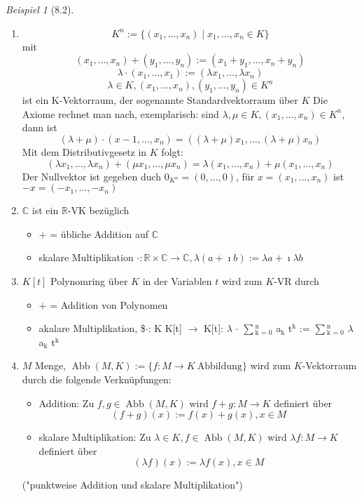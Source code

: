 \documentclass[a4paper]{scrartcl}
\DeclareMathOperator{\Abb}{Abb}
\theoremstyle{definition}
\theoremstyle{plain}
\theoremstyle{plain}
\theoremstyle{remark}
\theoremstyle{remark}
\theoremstyle{remark}
\theoremstyle{remark}
\theoremstyle{remark}
\newtheorem{ex}{Beispiel}
\newcommand{\I}{\ensuremath{\imath}}%
\begin{document}
\begin{ex}[8.2]
\mbox{}
\begin{enumerate}
\item \[K^n := \{(x_1,\ldots,x_n) \mid x_1,\ldots,x_n \in K\}\]
mit
\[(x_1,\ldots,x_n) + (y_1,\ldots,y_n) := (x_1 + y_1,\ldots,x_n + y_n)\]
\[\lambda\cdot(x_1,\ldots,x_1) := (\lambda x_1,\ldots,\lambda x_n)\]
\[\lambda \in K, (x_1,\ldots,x_n),(y_1,\ldots,y_n)\in K^n\]
ist ein K-Vektorraum, der sogenannte Standardvektorraum über $K$
Die Axiome rechnet man nach, exemplarisch: sind $\lambda,\mu\in K, (x_1,\ldots,x_n)\in K^n$, dann ist
\[(\lambda + \mu) \cdot (x-1,\ldots,x_n) = ((\lambda + \mu)x_1,\ldots,(\lambda + \mu)x_n)\]
Mit dem Distributivgesetz in $K$ folgt:
\[(\lambda x_1,\ldots,\lambda x_n) + (\mu x_1,\ldots,\mu x_n) = \lambda(x_1,\ldots,x_n) + \mu(x_1,\ldots,x_n)\]
Der Nullvektor ist gegeben duch $0_{K^n} = (0,\ldots,0)$, für $x =(x_1,\ldots,x_n)$ ist $-x = (-x_1,\ldots,-x_n)$
\item $\mathbb{C}$ ist ein $\mathbb{R}$-VK bezüglich
\begin{itemize}
\item $+$ = übliche Addition auf $\mathbb{C}$
\item skalare Multiplikation $\cdot:\mathbb{R}\times\mathbb{C} \to \mathbb{C}, \lambda (a + \I b) := \lambda a + \I \lambda b$
\end{itemize}
\item $K[t]$ Polynomring über $K$ in der Variablen $t$ wird zum $K$-VR durch
\begin{itemize}
\item $+$ = Addition von Polynomen
\item akalare Multiplikation, \$$\cdot$: K\texttimes{} K[t] $\to$ K[t]: $\lambda$ $\cdot$ $\sum$$_{\text{k = 0}}^{\text{n}}$ a$_{\text{k}}$ t$^{\text{k}}$ := $\sum$$_{\text{k = 0}}^{\text{n}}$ $\lambda$ a$_{\text{k}}$ t$^{\text{k}}$
\end{itemize}
\item $M$ Menge, $\Abb(M,K):= \{f: M \to K~\text{Abbildung}\}$ wird zum $K$-Vektorraum durch die folgende Verknüpfungen:
\begin{itemize}
\item Addition: Zu $f,g\in \Abb(M,K)$ wird $f + g: M \to K$ definiert über
\[(f + g)(x) := f(x) + g(x), x\in M\]
\item skalare Multiplikation: Zu $\lambda \in K, f\in \Abb(M,K)$ wird $\lambda f: M \to K$ definiert über
\[(\lambda f)(x) := \lambda f(x), x\in M\]
\end{itemize}
("punktweise Addition und skalare Multiplikation")
\end{enumerate}
\end{ex}
\end{document}
